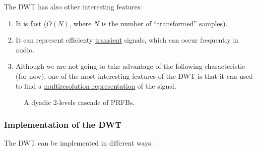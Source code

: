 The DWT has also other interesting features:
\begin{enumerate}
\item It is
  \href{https://en.wikipedia.org/wiki/Discrete_wavelet_transform#Time_complexity}{fast}
  ($O(N)$, where $N$ is the number of ``transformed'' samples).
\item It can represent efficienty
  \href{https://en.wikipedia.org/wiki/Transient_(oscillation)}{transient}
  signals, which can occur frequently in audio.
\item Although we are not going to take advantage of the following
  characteristic (for now), one of the most interesting features of
  the DWT is that it can used to find a
  \href{https://en.wikipedia.org/wiki/Multiresolution_analysis}{multiresolution
    representation} of the signal.
\end{enumerate}

\begin{figure}
  \centering
  \caption{A dyadic 2-levels cascade of PRFBs.}
  \label{fig:cascade}
\end{figure}


\subsubsection{Implementation of the DWT}

The DWT can be implemented in different ways:

